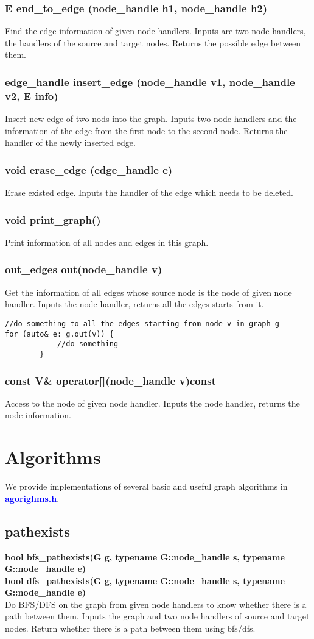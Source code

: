 \documentclass[]{article}
\begin{document}
\subsubsection{E end\_to\_edge (node\_handle h1, node\_handle h2)}
Find the edge information of given node handlers.
Inputs are two node handlers, the handlers of the source and target nodes. Returns the possible edge between them.
\subsubsection{edge\_handle insert\_edge (node\_handle v1, node\_handle v2, E info)}
Insert new edge of two nods into the graph.
Inputs two node handlers and the information of the edge from the first node to the second node. Returns the handler of the newly inserted edge.
\subsubsection{void erase\_edge (edge\_handle e)}
Erase existed edge.
Inputs the handler of the edge which needs to be deleted.
\subsubsection{void print\_graph()}
Print information of all nodes and edges in this graph.
\subsubsection{out\_edges out(node\_handle v)}
Get the information of all edges whose source node is the node of given node handler.
Inputs the node handler, returns all the edges starts from it.
\begin{lstlisting}
//do something to all the edges starting from node v in graph g
for (auto& e: g.out(v)) {
            //do something
        }
\end{lstlisting}
\subsubsection{const V\& operator[](node\_handle v)const}
Access to the node of given node handler.
Inputs the node handler, returns the node information.
\section {Algorithms}
We provide implementations of several basic and useful graph algorithms in \textbf{\textcolor{blue}{agorighms.h}}.
\subsection{pathexists}
\textbf{bool bfs\_pathexists(G g, typename G::node\_handle s, typename G::node\_handle e)}\\
\textbf{bool dfs\_pathexists(G g, typename G::node\_handle s, typename G::node\_handle e)}\\
Do BFS/DFS on the graph from given node handlers to know whether there is a path between them.
Inputs the graph and two node handlers of source and target nodes. Return whether there is a path between them using bfs/dfs.
\end{document}
